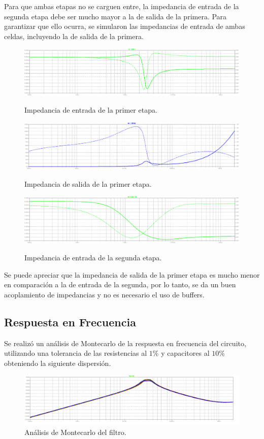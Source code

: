 Para que ambas etapas no se carguen entre, la impedancia de entrada de la segunda etapa debe ser mucho mayor a la de salida de la primera. Para garantizar que ello ocurra, se simularon las impedancias de entrada de ambas celdas, incluyendo la de salida de la primera.
\begin{figure}[H]
	\centering
	\includegraphics[width=\textwidth]{Imagenes-Ej2/ZinE1.png}
	\label{fig:graph}
	\caption{Impedancia de entrada de la primer etapa.}
\end{figure}
\begin{figure}[H]
	\centering
	\includegraphics[width=\textwidth]{Imagenes-Ej2/ZoutE1.png}
	\label{fig:graph}
	\caption{Impedancia de salida de la primer etapa.}
\end{figure}
\begin{figure}[H]
	\centering
	\includegraphics[width=\textwidth]{Imagenes-Ej2/ZinE2.png}
	\label{fig:graph}
	\caption{Impedancia de entrada de la segunda etapa.}
\end{figure}

Se puede apreciar que la impedancia de salida de la primer etapa es mucho menor en comparación a la de entrada de la segunda, por lo tanto, se da un buen acoplamiento de impedancias y no es necesario el uso de buffers.

\subsection{Respuesta en Frecuencia}
Se realizó un análisis de Montecarlo de la respuesta en frecuencia del circuito, utilizando una tolerancia de las resistencias al $1\%$ y capacitores al $10\%$ obteniendo la siguiente dispersión.
\begin{figure}[H]
	\centering
	\includegraphics[width=\textwidth]{Imagenes-Ej2/mcF.png}
	\caption{Análisis de Montecarlo del filtro.}
	\label{fig:mcrauch}
\end{figure}

